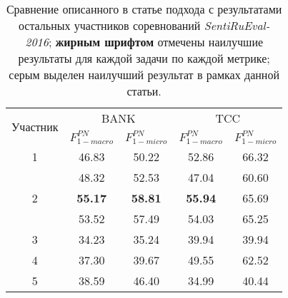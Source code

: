 \begin{table}[htp!]
\centering
\caption{Сравнение описанного в статье подхода с результатами остальных
    участников соревнований {\it SentiRuEval-2016}; {\bf жирным шрифтом}
    отмечены наилучшие результаты для каждой задачи по каждой метрике;
    серым выделен наилучший результат в рамках данной статьи.
}
\label{table:comparison}
\begin{tabular}{ccccc}
\hline
\multicolumn{1}{l|}{\multirow{2}{*}{Участник}}                       & \multicolumn{2}{c|}{BANK}                                                         & \multicolumn{2}{c}{TCC}                                      \\ \cline{2-5}
\multicolumn{1}{l|}{}                                                & \multicolumn{1}{c|}{$F_{1-macro}^{PN}$} & \multicolumn{1}{c|}{$F_{1-micro}^{PN}$} & \multicolumn{1}{c|}{$F_{1-macro}^{PN}$} & $F_{1-micro}^{PN}$ \\ \hline
1                               & 46.83                              & 50.22                                   & 52.86                                   & 66.32                                                        \\ \cline{2-5}
\multirow{3}{*}{2}              & 48.32                              & 52.53                                   & 47.04                                   & 60.60                                                        \\
                                & \textbf{55.17}                     & \textbf{58.81}                          & \textbf{55.94}                          & 65.69                                                        \\
                                & 53.52                              & 57.49                                   & 54.03                                   & 65.25                                                        \\ \cline{2-5}
3                               & 34.23                              & 35.24                                   & 39.94                                   & 39.94                                                        \\
4                               & 37.30                              & 39.67                                   & 49.55                                   & 62.52                                                        \\
5                               & 38.59                              & 46.40                                   & 34.99                                   & 40.44                                                        \\

\end{tabular}
\end{table}
